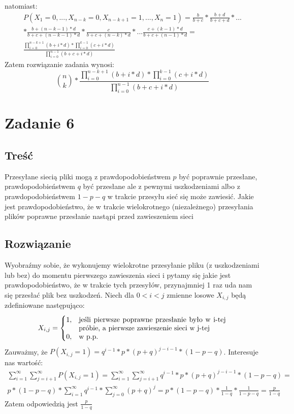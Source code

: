 \documentclass[10pt, a4paper]{article}
\begin{document}
natomiast:
\begin{align*}
P(X_1=0, ..., X_{n-k} = 0, X_{n-k+1} = 1, ..., X_n=1) = \frac{b}{b+c} * \frac{b+d}{b+c+d} * ... \\ * \frac{b+(n-k-1)*d}{b+c+(n-k-1)*d} * \frac{c}{b+c+(n-k)*d} * ... \frac{c+(k-1)*d}{b+c+(n-1)*d}  = \\ \frac{\prod_{i=0}^{n-k+1} (b + i * d) * \prod_{i=0}^{k-1} (c + i * d)}{\prod_{i=0}^{n-1} (b + c + i * d)}
\end{align*} 
Zatem rozwiązanie zadania wynosi:
\begin{equation}
{n \choose k} * \frac{\prod_{i=0}^{n-k+1} (b + i * d) * \prod_{i=0}^{k-1} (c + i * d)}{\prod_{i=0}^{n-1} (b + c + i * d)}
\end{equation}
\section*{Zadanie 6}
\subsection*{Treść}
Przesyłane siecią pliki mogą z prawdopodobieństwem $p$ być poprawnie przesłane, prawdopodobieństwem $q$ być przesłane ale z pewnymi uszkodzeniami albo z prawdopodobieństwem $1-p-q$ w trakcie przesyłu sieć się może zawiesić. Jakie jest prawdopodobieństwo, że w trakcie wielokrotnego (niezależnego) przesyłania plików poprawne przesłanie nastąpi przed zawieszeniem sieci
\subsection*{Rozwiązanie}
Wyobraźmy sobie, że wykonujemy wielokrotne przesyłanie pliku (z uszkodzeniami lub bez) do momentu pierwszego zawieszenia sieci i pytamy się jakie jest prawdopodobieństwo, że w trakcie tych przesyłów, przynajmniej 1 raz uda nam się przesłać plik bez uszkodzeń. Niech dla $0 < i < j$ zmienne losowe $X_{i, j}$ będą zdefiniowane następująco:
\begin{equation}
 X_{i, j} = 
 \begin{cases}
        1, & \parbox[t]{.6\textwidth}{jeśli pierwsze poprawne przesłanie było w i-tej próbie, a pierwsze zawieszenie sieci w j-tej} \\
        0, & \text{w p.p.}
 \end{cases}
\end{equation}
Zauważmy, że $P(X_{i, j} = 1) = q^{i-1} * p * (p + q)^{j - i - 1} * (1 - p - q)$. Interesuje nas wartość:
\begin{align*}
\sum_{i = 1}^{\infty} \sum_{j = i + 1}^{\infty} P(X_{i, j} = 1) = \sum_{i = 1}^{\infty} \sum_{j = i + 1}^{\infty} q^{i-1} * p * (p + q)^{j - i - 1} * (1 - p - q) = \\ p * (1 - p - q) * \sum_{i = 1}^{\infty} q^{i-1} * \sum_{j = 0}^{\infty} (p + q)^{j} = p * (1 - p - q) * \frac{1}{1-q} * \frac{1}{1 - p -q} = \frac{p}{1-q}
\end{align*}
Zatem odpowiedzią jest $\frac{p}{1 - q}$
\end{document}

